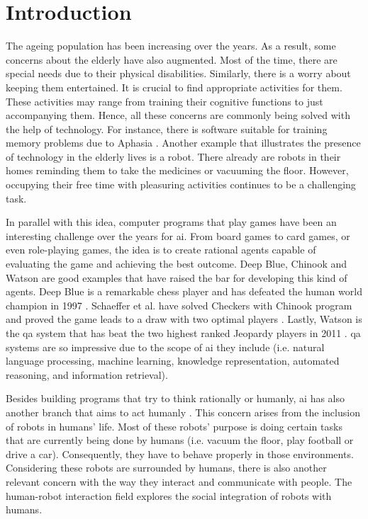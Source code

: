 \section{Introduction} \label{introduction}

The ageing population has been increasing over the years.
As a result, some concerns about the elderly have also augmented.
Most of the time, there are special needs due to their physical disabilities.
Similarly, there is a worry about keeping them entertained.
It is crucial to find appropriate activities for them.
These activities may range from training their cognitive functions to just accompanying them.
Hence, all these concerns are commonly being solved with the help of technology.
For instance, there is software suitable for training memory problems due to Aphasia \cite{Pompili2011}.
Another example that illustrates the presence of technology in the elderly lives is a robot.
There already are robots in their homes reminding them to take the medicines or vacuuming the floor.
However, occupying their free time with pleasuring activities continues to be a challenging task.


In parallel with this idea, computer programs that play games have been an interesting challenge over the years for \gls{ai}.
From board games to card games, or even role-playing games, the idea is to create rational agents capable of evaluating the game and achieving the best outcome.
Deep Blue, Chinook and Watson are good examples that have raised the bar for developing this kind of agents.
Deep Blue is a remarkable chess player and has defeated the human world champion in 1997 \cite{Campbell2002}.
Schaeffer et al. have solved Checkers with Chinook program and proved the game leads to a draw with two optimal players \cite{Schaeffer1996}.
Lastly, Watson is the \gls{qa} system that has beat the two highest ranked Jeopardy players in 2011 \cite{Ferrucci2010}.
\gls{qa} systems are so impressive due to the scope of \gls{ai} they include (i.e. natural language processing, machine learning, knowledge representation, automated reasoning, and information retrieval).

Besides building programs that try to think rationally or humanly, \gls{ai} has also another branch that aims to act humanly \cite{Russell2009}.
This concern arises from the inclusion of robots in humans' life.
Most of these robots' purpose is doing certain tasks that are currently being done by humans (i.e. vacuum the floor, play football or drive a car).
Consequently, they have to behave properly in those environments.
Considering these robots are surrounded by humans, there is also another relevant concern with the way they interact and communicate with people.
The human-robot interaction field explores the social integration of robots with humans.

